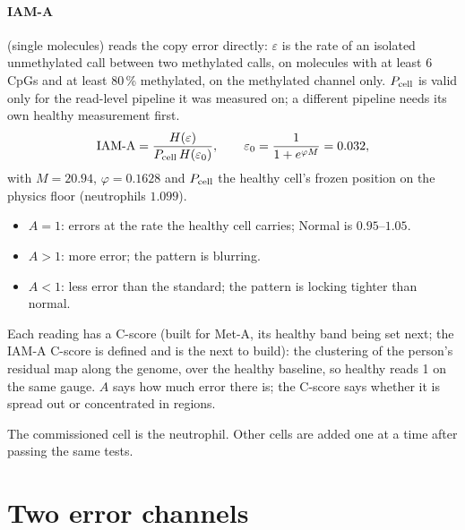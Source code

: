 \paragraph{IAM-A} (single molecules) reads the copy error directly: $\varepsilon$ is the rate of an isolated unmethylated call between two
methylated calls, on molecules with at least 6 CpGs and at least 80\,\% methylated, on the methylated channel only. $P_{\rm cell}$ is valid only for the read-level pipeline it was measured on; a different pipeline needs its own healthy measurement first.
\begin{equation}\text{IAM-A}=\frac{H(\varepsilon)}{P_{\rm cell}\,H(\varepsilon_0)},\qquad \varepsilon_0=\frac{1}{1+e^{\varphi M}}=0.032,\end{equation}
with $M=20.94$, $\varphi=0.1628$ and $P_{\rm cell}$ the healthy cell's frozen position on the physics floor (neutrophils $1.099$).
\begin{itemize}
\item $A=1$: errors at the rate the healthy cell carries; Normal is $0.95$--$1.05$.
\item $A>1$: more error; the pattern is blurring.
\item $A<1$: less error than the standard; the pattern is locking tighter than normal.
\end{itemize}
Each reading has a C-score (built for Met-A, its healthy band being set next; the IAM-A C-score is defined and is the next to build): the clustering of the person's residual map along the genome, over the healthy baseline, so healthy reads 1 on the same
gauge. $A$ says how much error there is; the C-score says whether it is spread out or concentrated in regions.

The commissioned cell is the neutrophil. Other cells are added one at a time after passing the same tests.

\section{Two error channels}

